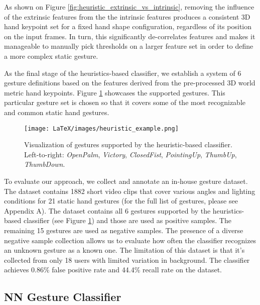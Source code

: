 \documentclass[10pt,twocolumn,letterpaper]{article}
\begin{document}
As shown on Figure \ref{fig:heuristic_extrinsic_vs_intrinsic}, removing the influence of the extrinsic features from the the intrinsic features produces a consistent 3D hand keypoint set for a fixed hand shape configuration,  regardless of its position on the input frames.  In turn, this significantly de-correlates features and makes it manageable to manually pick thresholds on a larger feature set in order to define a more complex static gesture.

As the final stage of the heuristics-based classifier, we establish a system of 6 gesture definitions based on the features derived from the pre-processed 3D world metric hand keypoints. Figure \ref{fig:heuristic_example} showcases the supported gestures. This particular gesture set is chosen so that it covers some of the most recognizable and common static hand gestures.

\begin{figure}
\begin{center}
   \texttt{[image: LaTeX/images/heuristic\_example.png]}
\end{center}
   \caption{Visualization of gestures supported by the heuristic-based classifier. Left-to-right: \textit{OpenPalm}, \textit{Victory}, \textit{ClosedFist}, \textit{PointingUp}, \textit{ThumbUp}, \textit{ThumbDown}.}
\label{fig:heuristic_example}
\end{figure}

To evaluate our approach, we collect and annotate an in-house gesture dataset. The dataset contains 1882 short video clips that cover various angles and lighting conditions for 21 static hand gestures (for the full list of gestures, please see Appendix A). The dataset contains all 6 gestures supported by the heuristics-based classifier (see Figure \ref{fig:heuristic_example}) and those are used as positive samples. The remaining 15 gestures are used as negative samples. The presence of a diverse negative sample collection allows us to evaluate how often the classifier recognizes an unknown gesture as a known one. The limitation of this dataset is that it’s collected from only 18 users with limited variation in background. The classifier achieves 0.86\% false positive rate and 44.4\% recall rate on the dataset.

\subsection{NN Gesture Classifier}\label{section:nn_gesture}
\end{document}
